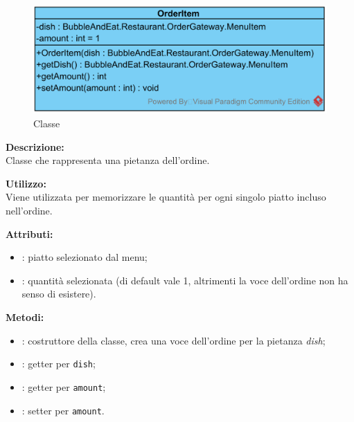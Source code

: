 \subparagraph[::OrderItem]{\class}\mbox{}\\ \label{\class}
\begin{figure}[H]
	\centering
	\includegraphics[width=12cm]{./diagrammi/demo/server/order/orderitem.png}
	\caption{Classe \class}
\end{figure}
\textbf{Descrizione:}\\
Classe che rappresenta una pietanza dell'ordine.

\textbf{Utilizzo:}\\
Viene utilizzata per memorizzare le quantità per ogni singolo piatto incluso nell'ordine.

%

\textbf{Attributi:}
\begin{itemize}
	\item {}: piatto selezionato dal menu;
	\item {}: quantità selezionata (di default vale 1, altrimenti la voce dell'ordine non ha senso di esistere).
\end{itemize}

\textbf{Metodi:}
\begin{itemize}
	\item {}: costruttore della classe, crea una voce dell'ordine per la pietanza \emph{dish};
	\item {}: getter per \texttt{dish};
	\item {}: getter per \texttt{amount};
	\item {}: setter per \texttt{amount}.
\end{itemize}